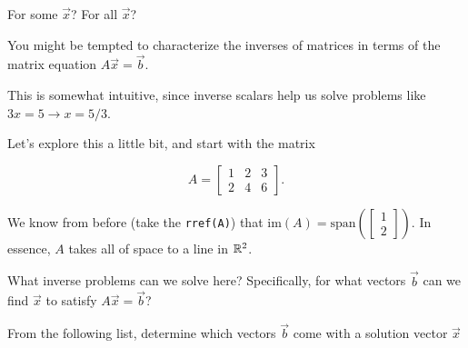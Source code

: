 \documentclass{ximera}
\begin{document}
\begin{exploration}{For some $\vec{x}$? For all $\vec{x}$?}

  You might be tempted to characterize the inverses of matrices in terms of the matrix equation $A\vec{x}=\vec{b}$. 
  
  This is somewhat intuitive, since inverse scalars help us solve problems like $3x=5\rightarrow x=5/3$. 

  Let's explore this a little bit, and start with the matrix 

  $$A=\begin{bmatrix}1&2&3\\2&4&6\end{bmatrix}.$$

  We know from before (take the \texttt{rref(A)}) that $\mbox{im}(A)=\mbox{span}\left(\begin{bmatrix}1\\2\end{bmatrix}\right)$. In essence, $A$ takes all of space to a line in $\mathbb{R}^2$.

  What inverse problems can we solve here? Specifically, for what vectors $\vec{b}$ can we find $\vec{x}$ to satisfy $A\vec{x}=\vec{b}$?

  From the following list, determine which vectors $\vec{b}$ come with a solution vector $\vec{x}$

  \begin{selectAll}
  






\end{selectAll}
\end{exploration}
\end{document}
